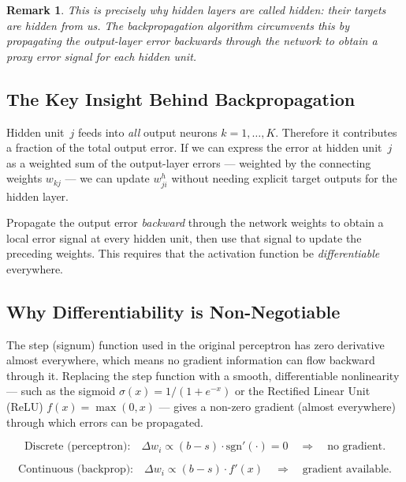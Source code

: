 \documentclass[12pt,a4paper]{article}
\newtheorem{remark}{Remark}[section]
\newcommand{\wji}{w_{ji}^{h}}
\newcommand{\wkj}{w_{kj}}
\begin{document}
\begin{remark}
\label{rem:why-hidden}
This is precisely why hidden layers are called \emph{hidden}: their targets are
hidden from us.  The backpropagation algorithm circumvents this by propagating
the \emph{output-layer error} backwards through the network to obtain a proxy
error signal for each hidden unit.
\end{remark}

\subsection{The Key Insight Behind Backpropagation}

Hidden unit~$j$ feeds into \emph{all} output neurons $k = 1,\ldots,K$.
Therefore it contributes a fraction of the total output error.  If we can
express the error at hidden unit~$j$ as a weighted sum of the output-layer
errors --- weighted by the connecting weights $\wkj$ --- we can update $\wji$
without needing explicit target outputs for the hidden layer.

\begin{keyinsight}[title=Core Backpropagation Idea]
Propagate the output error \emph{backward} through the network weights to
obtain a local error signal at every hidden unit, then use that signal to
update the preceding weights.  This requires that the activation function be
\emph{differentiable} everywhere.
\end{keyinsight}

\subsection{Why Differentiability is Non-Negotiable}

The step (signum) function used in the original perceptron has zero derivative
almost everywhere, which means no gradient information can flow backward through
it.  Replacing the step function with a smooth, differentiable nonlinearity
--- such as the sigmoid $\sigma(x) = 1/(1+e^{-x})$ or the
Rectified Linear Unit (ReLU) $f(x)=\max(0,x)$ --- gives a non-zero gradient
(almost everywhere) through which errors can be propagated.

\begin{equation}
  \text{Discrete (perceptron):}\quad
  \Delta w_i \propto (b - s)\cdot\text{sgn}'(\cdot) = 0
  \quad\Rightarrow\quad \text{no gradient.}
\end{equation}

\begin{equation}
  \text{Continuous (backprop):}\quad
  \Delta w_i \propto (b - s)\cdot f'(x)
  \quad\Rightarrow\quad \text{gradient available.}
  \label{eq:continuous-delta}
\end{equation}
\end{document}
